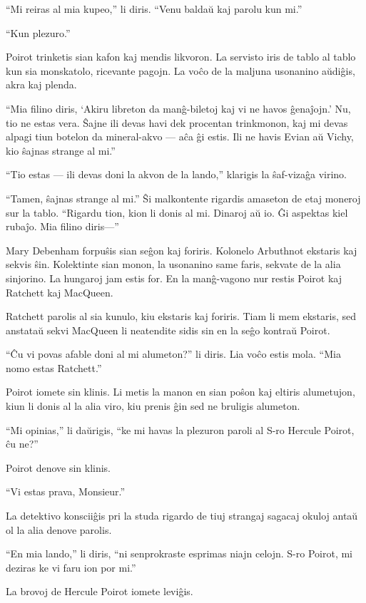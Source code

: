 ``Mi reiras al mia kupeo,'' li diris. ``Venu baldaŭ kaj parolu kun mi.''

``Kun plezuro.''

Poirot trinketis sian kafon kaj mendis likvoron. La servisto iris de tablo al tablo kun sia monskatolo, ricevante pagojn. La voĉo de la maljuna usonanino aŭdiĝis, akra kaj plenda.

``Mia filino diris, `Akiru libreton da manĝ-biletoj kaj vi ne havos ĝenaĵojn.' Nu, tio ne estas vera. Ŝajne ili devas havi dek procentan trinkmonon, kaj mi devas alpagi tiun botelon da mineral-akvo --- aĉa ĝi estis. Ili ne havis Evian aŭ Vichy, kio ŝajnas strange al mi.''

``Tio estas --- ili devas doni la akvon de la lando,'' klarigis la ŝaf-vizaĝa virino.

``Tamen, ŝajnas strange al mi.'' Ŝi malkontente rigardis amaseton de etaj moneroj sur la tablo. ``Rigardu tion, kion li donis al mi. Dinaroj aŭ io. Ĝi aspektas kiel rubaĵo. Mia filino diris---''

Mary Debenham forpuŝis sian seĝon kaj foriris. Kolonelo Arbuthnot ekstaris kaj sekvis ŝin. Kolektinte sian monon, la usonanino same faris, sekvate de la alia sinjorino. La hungaroj jam estis for. En la manĝ-vagono nur restis Poirot kaj Ratchett kaj MacQueen.

Ratchett parolis al sia kunulo, kiu ekstaris kaj foriris. Tiam li mem ekstaris, sed anstataŭ sekvi MacQueen li neatendite sidis sin en la seĝo kontraŭ Poirot.

``Ĉu vi povas afable doni al mi alumeton?'' li diris. Lia voĉo estis mola. ``Mia nomo estas Ratchett.''

Poirot iomete sin klinis. Li metis la manon en sian poŝon kaj eltiris alumetujon, kiun li donis al la alia viro, kiu prenis ĝin sed ne bruligis alumeton.

``Mi opinias,'' li daŭrigis, ``ke mi havas la plezuron paroli al S-ro Hercule Poirot, ĉu ne?''

Poirot denove sin klinis.

``Vi estas prava, Monsieur.''

La detektivo konsciiĝis pri la studa rigardo de tiuj strangaj sagacaj okuloj antaŭ ol la alia denove parolis.

``En mia lando,'' li diris, ``ni senprokraste esprimas niajn celojn. S-ro Poirot, mi deziras ke vi faru ion por mi.''

La brovoj de Hercule Poirot iomete leviĝis.

